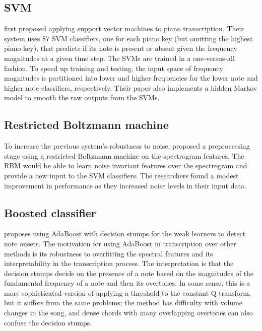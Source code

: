 \documentclass[5p]{elsarticle}
\begin{document}
\subsection{SVM}


\citet{poliner2006discriminative} first proposed applying support vector machines to piano transcription. Their system uses 87 SVM classifiers, one for each piano key (but omitting the highest piano key), that predicts if its note is present or absent given the frequency magnitudes at a given time step. The SVMs are trained in a one-versus-all fashion. To speed up training and testing, the input space of frequency magnitudes is partitioned into lower and higher frequencies for the lower note and higher note classifiers, respectively. Their paper also implements a hidden Markov model to smooth the raw outputs from the SVMs.


\subsection{Restricted Boltzmann machine}

To increase the previous system's robustness to noise, \citet{nam2011classification} proposed a preprocessing stage using a restricted Boltzmann machine on the spectrogram features. The RBM would be able to learn noise invariant features over the spectrogram and provide a new input to the SVM classifiers. The researchers found a modest improvement in performance as they increased noise levels in their input data.

\subsection{Boosted classifier}

\citet{boogaart2009note} proposes using AdaBoost with decision stumps for the weak learners to detect note onsets. The motivation for using AdaBoost in transcription over other methods is its robustness to overfitting the spectral features and its interpretability in the transcription process. The interpretation is that the decision stumps decide on the presence of a note based on the magnitudes of the fundamental frequency of a note and then its overtones. In some sense, this is a more sophisticated version of applying a threshold to the constant Q transform, but it suffers from the same problems; the method has difficulty with volume changes in the song, and dense chords with many overlapping overtones can also confuse the decision stumps.
\end{document}
